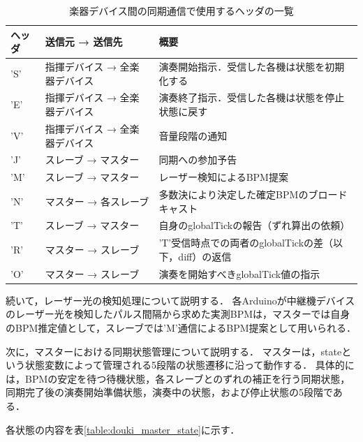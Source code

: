 \begin{table}[H]
    \caption{楽器デバイス間の同期通信で使用するヘッダの一覧}
    \centering
    \label{table:douki_headers}
    \begin{tabular}{p{1.5cm}p{4.3cm}p{7.7cm}}
    \hline
    ヘッダ & 送信元 → 送信先 & 概要\\
    \hline\hline
    'S' & 指揮デバイス → 全楽器デバイス & 演奏開始指示．受信した各機は状態を初期化する\\
    \hline
    'E' & 指揮デバイス → 全楽器デバイス & 演奏終了指示．受信した各機は状態を停止状態に戻す\\
    \hline
    'V' & 指揮デバイス → 全楽器デバイス & 音量段階の通知\\
    \hline
    'J' & スレーブ → マスター & 同期への参加予告\\
    \hline
    'M' & スレーブ → マスター & レーザー検知によるBPM提案\\
    \hline
    'N' & マスター → 各スレーブ & 多数決により決定した確定BPMのブロードキャスト\\
    \hline
    'T' & スレーブ → マスター & 自身のglobalTickの報告（ずれ算出の依頼）\\
    \hline
    'R' & マスター → スレーブ & 'T'受信時点での両者のglobalTickの差（以下，diff）の返信\\
    \hline
    'O' & マスター → スレーブ & 演奏を開始すべきglobalTick値の指示\\
    \hline
    \end{tabular}
\end{table}

続いて，レーザー光の検知処理について説明する．
各Arduinoが中継機デバイスのレーザー光を検知したパルス間隔から求めた実測BPMは，マスターでは自身のBPM推定値として，スレーブでは'M'通信によるBPM提案として用いられる．


次に，マスターにおける同期状態管理について説明する．
マスターは，stateという状態変数によって管理される5段階の状態遷移に沿って動作する．
具体的には，BPMの安定を待つ待機状態，各スレーブとのずれの補正を行う同期状態，同期完了後の演奏開始準備状態，演奏中の状態，および停止状態の5段階である．

\iffalse
各状態の内容を表\ref{table:douki_master_state}に示す．

